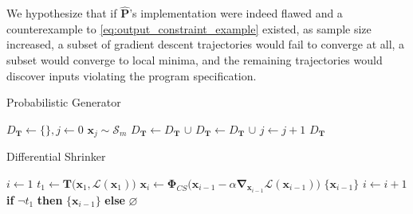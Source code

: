 \documentclass[12pt,initial,twoside,maitrise]{dms}
\numberwithin{equation}{section}
\numberwithin{table}{chapter}
\numberwithin{figure}{chapter}
\begin{document}
We hypothesize that if $\mathbf{\hat P}$'s implementation were indeed flawed and a counterexample to \autoref{eq:output_constraint_example} existed, as sample size increased, a subset of gradient descent trajectories would fail to converge at all, a subset would converge to local minima, and the remaining trajectories would discover inputs violating the program specification.

\begin{algorithm}[ht]
\caption{Probabilistic Generator}
\label{alg:prob_adversary}
\begin{algorithmic}[1]
\State $D_\mathbf T \gets \{\}, j \gets 0$
\State $\mathbf{x}_j \sim \mathcal S_m$
 
\State $D_\mathbf T \gets D_\mathbf T$ $\cup$ 
\Else {}
\State $D_\mathbf T \gets D_\mathbf T$ $\cup$  
\EndIf
\State $j \gets j + 1$
\EndWhile
\State \Return $D_\mathbf T$
\EndProcedure
\end{algorithmic}
\end{algorithm}

\begin{algorithm}[ht]
\caption{Differential Shrinker}
\label{alg:diff_adversary}
\begin{algorithmic}[1]
\State $i \gets 1$
\State $t_1 \gets \mathbf T\big(\mathbf x_1, \mathcal L(\mathbf x_1)\big)$ 
 
\State $\mathbf x_i \gets \bm\Phi_{CS}\big(\mathbf x_{i-1} - \alpha\mathbf\nabla_{\mathbf x_{i-1}} \mathcal{L}(\mathbf{x}_{i-1})\big)$ 
 
\State \Return $\{\mathbf{x}_{i-1}\}$ 
\EndIf
\State $i \gets i + 1$
\EndWhile
\State \Return \textbf{if } $\neg t_1$ \textbf{ then } $\{\mathbf x_{i-1}\}$ \textbf{ else } $\varnothing$ 
\EndProcedure
\end{algorithmic}
\end{algorithm}
\end{document}
